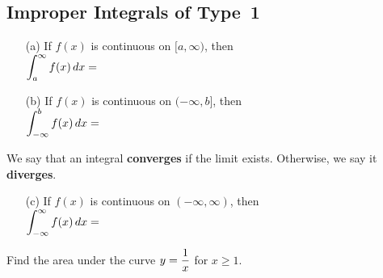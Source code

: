\documentclass[12pt]{article}
\begin{document}
\subsection*{Improper Integrals of Type~1}

\begin{itemize}
\item[(a)] If $f(x)$ is continuous on $[a,\infty)$, then\\

$\displaystyle\int_a^\infty f(x)\,dx=$

\vfill

\item[(b)] If $f(x)$ is continuous on $(-\infty,b]$, then\\

$\displaystyle\int_{-\infty}^b f(x)\,dx=$

\vfill

\end{itemize}

\noindent We say that an integral \textbf{converges} if the limit exists. Otherwise, we say it \textbf{diverges}.

\newpage

\begin{itemize}

\item[(c)] If $f(x)$ is continuous on $(-\infty,\infty)$, then\\

$\displaystyle\int_{-\infty}^\infty f(x)\,dx=$

\vspace{40mm}

\end{itemize}

\Example Find the area under the curve $y=\displaystyle\frac{1}{x}$ for $x\geq 1$.

\begin{flushright}
\end{flushright}
\end{document}
